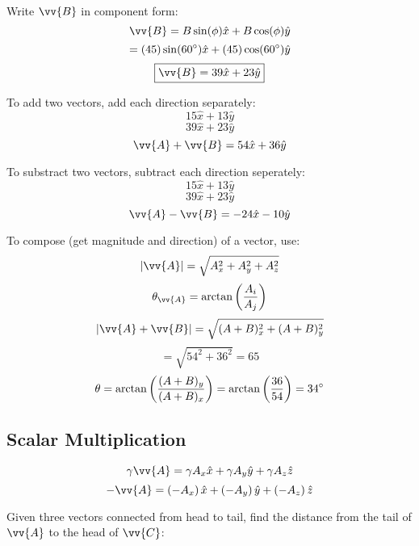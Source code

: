 \documentclass{article}
\begin{document}
Write $ \vv{B} $ in component form:
$$ \vv{B} = B \sin(\phi) \hat{x} + B \cos(\phi) \hat{y} $$
$$ = (45) \sin(60\degree) \hat{x} + (45) \cos(60\degree) \hat{y} $$
\begin{equation*}
    \boxed{\vv{B} = 39 \hat{x} + 23 \hat{y}}
\end{equation*}

To add two vectors, add each direction separately:
$$ 15 \hat{x} + 13 \hat{y} $$
$$ 39 \hat{x} + 23 \hat{y} $$
$$ \vv{A} + \vv{B} = 54 \hat{x} + 36 \hat{y} $$

To substract two vectors, subtract each direction seperately:
$$ 15 \hat{x} + 13 \hat{y} $$
$$ 39 \hat{x} + 23 \hat{y} $$
$$ \vv{A} - \vv{B} = -24 \hat{x} - 10 \hat{y} $$

To compose (get magnitude and direction) of a vector, use:
$$ |\vv{A}| = \sqrt{ A_{x}^{2} + A_{y}^{2} + A_{z}^{2} } $$
$$ \theta_{\vv{A}} = \arctan \left( \frac{A_{i}}{A_{j}} \right) $$
$$ |\vv{A} + \vv{B}| = \sqrt{ (A + B)_{x}^{2} + (A+B)_{y}^{2} } $$
$$ = \sqrt{54^{2} + 36^{2}} = 65 $$
$$ \theta = \arctan \left( \frac{(A + B)_{y}}{(A + B)_{x}} \right) = \arctan \left( \frac{36}{54} \right) = 34\degree $$

\subsection{Scalar Multiplication}

$$ \gamma \vv{A} = \gamma A_{x}\hat{x} + \gamma A_{y}\hat{y} + \gamma A_{z}\hat{z} $$
$$ -\vv{A} = \left( -A_{x} \right)\hat{x} + \left( -A_{y} \right)\hat{y} + \left( -A_{z} \right)\hat{z} $$

Given three vectors connected from head to tail, find the distance from the tail of $ \vv{A} $ to the head of $ \vv{C} $:

\end{document}
